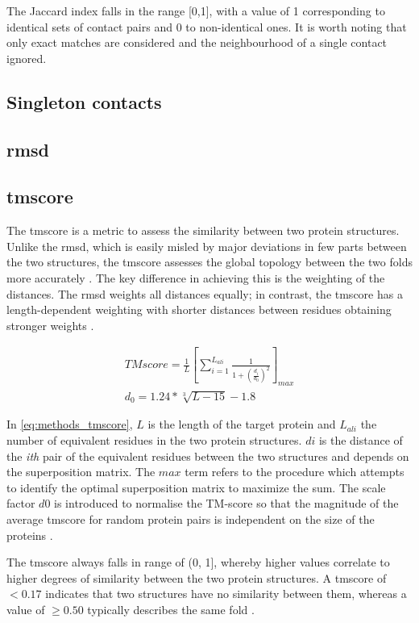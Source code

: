 The Jaccard index falls in the range [0,1], with a value of 1 corresponding to identical sets of contact pairs and 0 to non-identical ones. It is worth noting that only exact matches are considered and the neighbourhood of a single contact ignored.

\subsection{Singleton contacts} \label{sec:methods_singleton_contacts}
\subsection{\acrlong{rmsd}} \label{sec:methods_rmsd}
\subsection{\acrlong{tmscore}} \label{sec:methods_tmscore}
The \gls{tmscore} is a metric to assess the similarity between two protein structures. Unlike the \gls{rmsd}, which is easily misled by major deviations in few parts between the two structures, the \gls{tmscore} assesses the global topology between the two folds more accurately \cite{Zhang2005-hx}. The key difference in achieving this is the weighting of the distances. The \gls{rmsd} weights all distances equally; in contrast, the \gls{tmscore} has a length-dependent weighting with shorter distances between residues obtaining stronger weights \cite{Zhang2005-hx}.

\begin{align*}
TMscore=\frac{1}{L}\left [ \sum_{i=1}^{L_{ali}}\frac{1}{1+\left (\frac{d_i}{d_0}\right )^2}\right ]_{max}\label{eq:methods_tmscore} \\
d_0=1.24*\sqrt[3]{L-15}-1.8
\end{align*}

In \cref{eq:methods_tmscore}, $L$ is the length of the target protein and $L_{ali}$ the number of equivalent residues in the two protein structures. $di$ is the distance of the \textit{ith} pair of the equivalent residues between the two structures and depends on the superposition matrix. The $max$ term refers to the procedure which attempts to identify the optimal superposition matrix to maximize the sum. The scale factor $d0$ is introduced to normalise the TM-score so that the magnitude of the average \gls{tmscore} for random protein pairs is independent on the size of the proteins \cite{Zhang2005-hx}.

The \gls{tmscore} always falls in range of (0, 1], whereby higher values correlate to higher degrees of similarity between the two protein structures. A \gls{tmscore} of $<0.17$ indicates that two structures have no similarity between them, whereas a value of $\geq0.50$ typically describes the same fold \cite{Xu2010-sw}.

